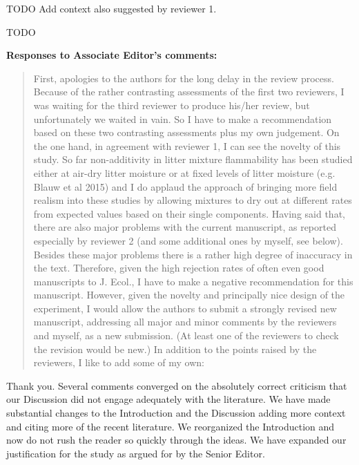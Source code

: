 \documentclass[letterpaper, 12pt]{letter}
\begin{document}
\begin{letter}{}
TODO
Add context also suggested by reviewer 1.

\begin{quote}
 
\end{quote}

TODO


{\bf Responses to Associate Editor's comments:}

\begin{quote}
First, apologies to the authors for the long delay in the review process. Because of the rather contrasting assessments of the first two reviewers, I was waiting for the third reviewer to produce his/her review, but unfortunately we waited in vain. So I have to make a recommendation based on these two contrasting assessments plus my own judgement. On the one hand, in agreement with reviewer 1, I can see the novelty of this study. So far non-additivity in litter mixture flammability has been studied either at air-dry litter moisture or at fixed levels of litter moisture (e.g. Blauw et al 2015) and I do applaud the approach of bringing more field realism into these studies by allowing mixtures to dry out at different rates from expected values based on their single components. Having said that, there are also major problems with the current manuscript, as reported especially by reviewer 2 (and some additional ones by myself, see below). Besides these major problems there is a rather high degree of inaccuracy in the text.  Therefore, given the high rejection rates of often even good manuscripts to J. Ecol., I have to make a negative recommendation for this manuscript. However, given the novelty and principally nice design of the experiment, I would allow the authors to submit a strongly revised new manuscript, addressing all major and minor comments by the reviewers and myself, as a new submission. (At least one of the reviewers to check the revision would be new.) In addition to the points raised by the reviewers, I like to add some of my own:
\end{quote}

Thank you. Several comments converged on the absolutely correct criticism that our Discussion did not engage adequately with the literature. We have made substantial changes to the Introduction and the Discussion adding more context and citing more of the recent literature. We reorganized the Introduction and now do not rush the reader so quickly through the ideas. We have expanded our justification for the study as argued for by the Senior Editor.




\end{letter}
\end{document}
